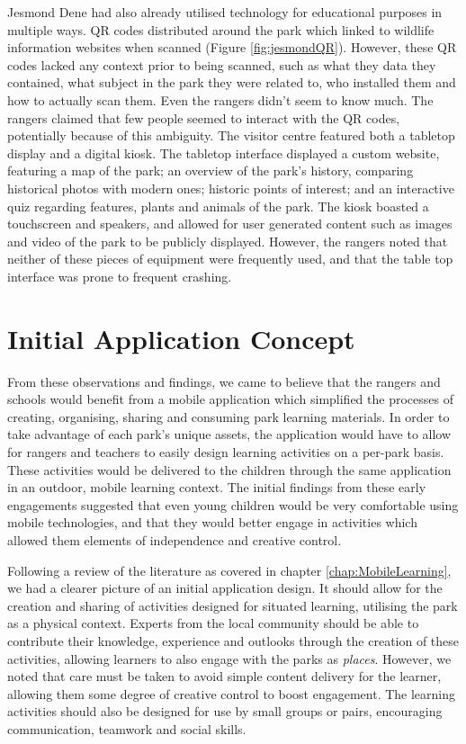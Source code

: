 Jesmond Dene had also already utilised technology for educational purposes in multiple ways. QR codes distributed around the park which linked to wildlife information websites when scanned (Figure \ref{fig:jesmondQR}). However, these QR codes lacked any context prior to being scanned, such as what they data they contained, what subject in the park they were related to, who installed them and how to actually scan them. Even the rangers didn't seem to know much. The rangers claimed that few people seemed to interact with the QR codes, potentially because of this ambiguity. The visitor centre featured both a tabletop display and a digital kiosk. The tabletop interface displayed a custom website, featuring a map of the park; an overview of the park's history, comparing historical photos with modern ones; historic points of interest; and an interactive quiz regarding features, plants and animals of the park. The kiosk boasted a touchscreen and speakers, and allowed for user generated content such as images and video of the park to be publicly displayed. However, the rangers noted that neither of these pieces of equipment were frequently used, and that the table top interface was prone to frequent crashing.

\section{Initial Application Concept}

From these observations and findings, we came to believe that the rangers and schools would benefit from a mobile application which simplified the processes of creating, organising, sharing and consuming park learning materials. In order to take advantage of each park’s unique assets, the application would have to allow for rangers and teachers to easily design learning activities on a per-park basis. These activities would be delivered to the children through the same application in an outdoor, mobile learning context. The initial findings from these early engagements suggested that even young children would be very comfortable using mobile technologies, and that they would better engage in activities which allowed them elements of independence and creative control. 

Following a review of the literature as covered in chapter \ref{chap:MobileLearning}, we had a clearer picture of an initial application design. It should allow for the creation and sharing of activities designed for situated learning, utilising the park as a physical context. Experts from the local community should be able to contribute their knowledge, experience and outlooks through the creation of these activities, allowing learners to also engage with the parks as \textit{places}. However, we noted that care must be taken to avoid simple content delivery for the learner, allowing them some degree of creative control to boost engagement. The learning activities should also be designed for use by small groups or pairs, encouraging communication, teamwork and social skills.

